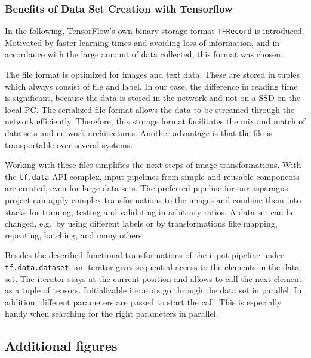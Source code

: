 \subsubsection{Benefits of Data Set Creation with Tensorflow}
\label{subsec:BenefitsDataSet}

In the following, TensorFlow's own binary storage format \texttt{TFRecord} is introduced. Motivated by faster learning times and avoiding loss of information, and in accordance with the large amount of data collected, this format was chosen.

The file format is optimized for images and text data. These are stored in tuples which always consist of file and label. In our case, the difference in reading time is significant, because the data is stored in the network and not on a SSD on the local PC. The serialized file format allows the data to be streamed through the network efficiently. Therefore, this storage format facilitates the mix and match of data sets and network architectures. Another advantage is that the file is transportable over several systems. 

Working with these files simplifies the next steps of image transformations. With the \mbox{\texttt{tf.data}} API complex, input pipelines from simple and reusable components are created, even for large data sets. The preferred pipeline for our asparagus project can apply complex transformations to the images and combine them into stacks for training, testing and validating in arbitrary ratios. A data set can be changed, e.g.\ by using different labels or by transformations like mapping, repeating, batching, and many others.

Besides the described functional transformations of the input pipeline under \mbox{\texttt{tf.data.dataset}}, an iterator gives sequential access to the elements in the data set. The iterator stays at the current position and allows to call the next element as a tuple of tensors. Initializable iterators go through the data set in parallel. In addition, different parameters are passed to start the call. This is especially handy when searching for the right parameters in parallel.

\newpage

\subsection{Additional figures}
\label{sec:AddFigures}


